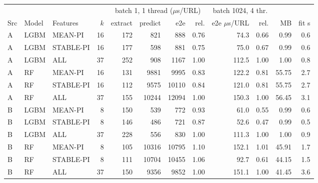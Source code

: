 \begin{tabular}{lllrrrrrrrrr}
\toprule
 & & & & \multicolumn{4}{c}{batch 1, 1 thread ($\mu$s/URL)} & \multicolumn{2}{c}{batch 1024, 4 thr.} & & \\
\cmidrule(lr){5-8}\cmidrule(lr){9-10}
Src & Model & Features & $k$ & extract & predict & e2e & rel. & e2e $\mu$s/URL & rel. & MB & fit s \\
\midrule
A & LGBM & MEAN-PI & 16 & 172 & 821 & 888 & 0.76 & 74.3 & 0.66 & 0.99 & 0.6 \\
A & LGBM & STABLE-PI & 16 & 177 & 598 & 881 & 0.75 & 75.0 & 0.67 & 0.99 & 0.6 \\
A & LGBM & ALL & 37 & 252 & 908 & 1167 & 1.00 & 112.5 & 1.00 & 1.00 & 0.8 \\
A & RF & MEAN-PI & 16 & 131 & 9881 & 9995 & 0.83 & 122.2 & 0.81 & 55.75 & 2.7 \\
A & RF & STABLE-PI & 16 & 112 & 9575 & 10110 & 0.84 & 121.0 & 0.81 & 55.75 & 2.7 \\
A & RF & ALL & 37 & 155 & 10244 & 12094 & 1.00 & 150.3 & 1.00 & 56.45 & 3.1 \\
B & LGBM & MEAN-PI & 8 & 150 & 539 & 772 & 0.93 & 61.0 & 0.55 & 0.99 & 0.6 \\
B & LGBM & STABLE-PI & 8 & 146 & 486 & 721 & 0.87 & 52.6 & 0.47 & 0.99 & 0.5 \\
B & LGBM & ALL & 37 & 228 & 556 & 830 & 1.00 & 111.3 & 1.00 & 1.00 & 0.9 \\
B & RF & MEAN-PI & 8 & 105 & 10316 & 10795 & 1.10 & 152.1 & 1.01 & 45.91 & 1.7 \\
B & RF & STABLE-PI & 8 & 111 & 10704 & 10455 & 1.06 & 92.7 & 0.61 & 44.15 & 1.5 \\
B & RF & ALL & 37 & 150 & 9356 & 9852 & 1.00 & 151.1 & 1.00 & 41.45 & 3.6 \\
\bottomrule
\end{tabular}
